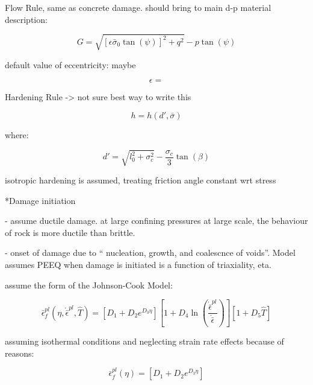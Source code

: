 Flow Rule, same as concrete damage. should bring to main d-p material
description:

\begin{equation}
G=\sqrt{\left[\epsilon\bar{\sigma}_{0}\tan\left(\psi\right)\right]^{2}+q^{2}}-p\tan\left(\psi\right)\label{eqn:druc5}
\end{equation}


default value of eccentricity: maybe

\begin{equation}
\epsilon=\label{eqn:druc5-1}
\end{equation}


Hardening Rule -> not sure best way to write this

\begin{equation}
h=h\left(d',\bar{\sigma}\right)\label{eqn:druc6}
\end{equation}


where:

\begin{equation}
d'=\sqrt{l_{0}^{2}+\sigma_{c}^{2}}-\frac{\sigma_{c}}{3}\tan\left(\beta\right)\label{eqn:druc6-1}
\end{equation}


isotropic hardening is assumed, treating friction angle constant wrt
stress

{*}Damage initiation

- assume ductile damage. at large confining pressures at large scale,
the behaviour of rock is more ductile than brittle.

- onset of damage due to `` nucleation, growth, and coalescnce of
voids''. Model assumes PEEQ when damage is initiated is a function
of triaxiality, eta.

assume the form of the Johnson-Cook Model:

\begin{equation}
\bar{\epsilon}_{f}^{pl}\left(\eta,\dot{\bar{\epsilon}}^{pl},\hat{T}\right)=\left[D_{1}+D_{2}e^{D_{3}\eta}\right]\left[1+D_{4}\ln\left(\frac{\dot{\bar{\epsilon}}^{pl}}{\dot{\bar{\epsilon}}}\right)\right]\left[1+D_{5}\hat{T}\right]\label{eqn:druc7}
\end{equation}


assuming isothermal conditions and neglecting strain rate effects
because of reasons:

\begin{equation}
\bar{\epsilon}_{f}^{pl}\left(\eta\right)=\left[D_{1}+D_{2}e^{D_{3}\eta}\right]\label{eqn:druc8}
\end{equation}


